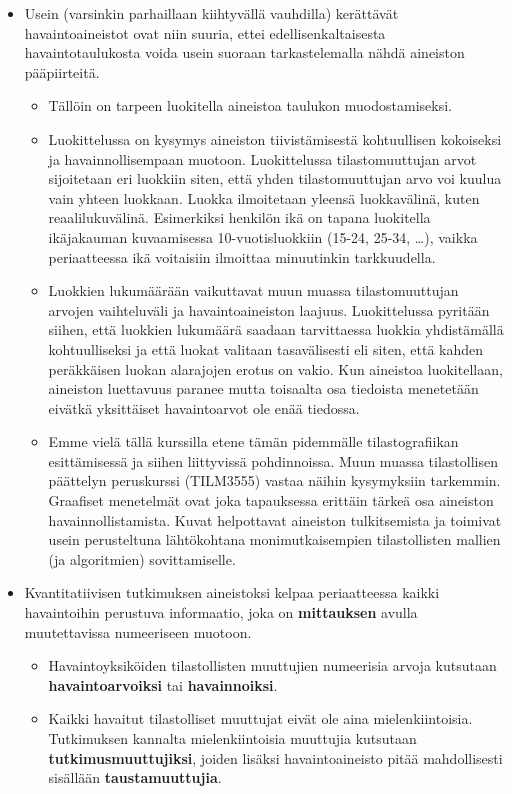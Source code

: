 \documentclass[
]{book}
\providecommand{\tightlist}{%
  \setlength{\itemsep}{0pt}\setlength{\parskip}{0pt}}
\begin{document}
\begin{itemize}
\item
  Usein (varsinkin parhaillaan kiihtyvällä vauhdilla) kerättävät havaintoaineistot ovat niin suuria, ettei edellisenkaltaisesta havaintotaulukosta voida usein suoraan tarkastelemalla nähdä aineiston pääpiirteitä.

  \begin{itemize}
  \tightlist
  \item
    Tällöin on tarpeen luokitella aineistoa taulukon muodostamiseksi.\\
  \item
    Luokittelussa on kysymys aineiston tiivistämisestä kohtuullisen kokoiseksi ja havainnollisempaan muotoon. Luokittelussa tilastomuuttujan arvot sijoitetaan eri luokkiin siten, että yhden tilastomuuttujan arvo voi kuulua vain yhteen luokkaan. Luokka ilmoitetaan yleensä luokkavälinä, kuten reaalilukuvälinä. Esimerkiksi henkilön ikä on tapana luokitella ikäjakauman kuvaamisessa 10-vuotisluokkiin (15-24, 25-34, \ldots), vaikka periaatteessa ikä voitaisiin ilmoittaa minuutinkin tarkkuudella.\\
  \item
    Luokkien lukumäärään vaikuttavat muun muassa tilastomuuttujan arvojen vaihteluväli ja havaintoaineiston laajuus. Luokittelussa pyritään siihen, että luokkien lukumäärä saadaan tarvittaessa luokkia yhdistämällä kohtuulliseksi ja että luokat valitaan tasavälisesti eli siten, että kahden peräkkäisen luokan alarajojen erotus on vakio. Kun aineistoa luokitellaan, aineiston luettavuus paranee mutta toisaalta osa tiedoista menetetään eivätkä yksittäiset havaintoarvot ole enää tiedossa.\\
  \item
    Emme vielä tällä kurssilla etene tämän pidemmälle tilastografiikan esittämisessä ja siihen liittyvissä pohdinnoissa. Muun muassa tilastollisen päättelyn peruskurssi (TILM3555) vastaa näihin kysymyksiin tarkemmin. Graafiset menetelmät ovat joka tapauksessa erittäin tärkeä osa aineiston havainnollistamista. Kuvat helpottavat aineiston tulkitsemista ja toimivat usein perusteltuna lähtökohtana monimutkaisempien tilastollisten mallien (ja algoritmien) sovittamiselle.
  \end{itemize}
\item
  Kvantitatiivisen tutkimuksen aineistoksi kelpaa periaatteessa kaikki havaintoihin perustuva informaatio, joka on \textbf{mittauksen} avulla muutettavissa numeeriseen muotoon.

  \begin{itemize}
  \tightlist
  \item
    Havaintoyksiköiden tilastollisten muuttujien numeerisia arvoja kutsutaan \textbf{havaintoarvoiksi} tai \textbf{havainnoiksi}.
  \item
    Kaikki havaitut tilastolliset muuttujat eivät ole aina mielenkiintoisia. Tutkimuksen kannalta mielenkiintoisia muuttujia kutsutaan \textbf{tutkimusmuuttujiksi}, joiden lisäksi havaintoaineisto pitää mahdollisesti sisällään \textbf{taustamuuttujia}.


\end{itemize}
\end{itemize}
\end{document}
